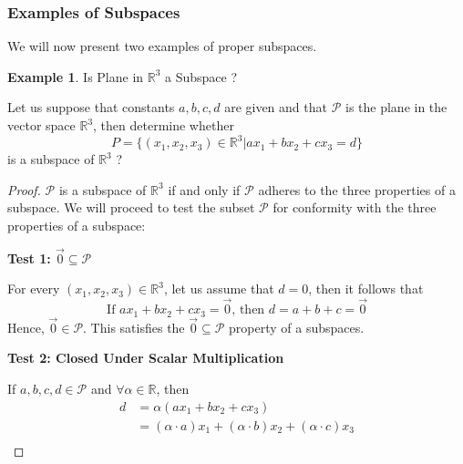 \documentclass{book}
\theoremstyle{definition}
\newtheorem{example}{Example}[definition]
\theoremstyle{remark}
\newcommand{\bb}[1]{\mathbb{#1}}
\newcommand{\cc}[1]{\mathcal{#1}}
\newcommand{\m}{\cdot}
\begin{document}
\newpage
\subsubsection{Examples of Subspaces}

We will now present two examples of proper subspaces. 

\begin{example}
Is Plane in $\bb{R}^3$ a Subspace ? 

    \begin{tcolorbox}
        Let us suppose that constants $a,b,c,d$ are given and that $\cc{P}$ is the plane in the vector space $\bb{R}^3$, then determine whether
        \begin{equation*}
            P = \{ (x_1,x_2,x_3) \in \bb{R}^3 | ax_1 + bx_2 + cx_3 = d \}
        \end{equation*}
        is a subspace of $\bb{R}^3$ ? \\
    \end{tcolorbox}
     
    \begin{proof}   
        $\cc{P}$ is a subspace of $\bb{R}^3$ if and only if $\cc{P}$ adheres to the three properties of a subspace. We will proceed to test the subset $\cc{P}$ for conformity with the three properties of a subspace: \\
        
        \begin{flushleft} \textbf{Test 1: $\vec{0} \subseteq \cc{P}$} \end{flushleft} 
            For every $(x_1,x_2,x_3) \in \bb{R}^3$, let us assume that $d=0$, then it follows that 
                \begin{equation*}
                    \text{If } ax_1 + bx_2 + cx_3 = \vec{0} \text{, then } d = a+b+c = \vec{0}
                \end{equation*}
            Hence, $ \vec{0} \in \cc{P}$. This satisfies the $\vec{0} \subseteq \cc{P}$ property of a subspaces. \\
        
        \begin{flushleft} \textbf{Test 2: Closed Under Scalar Multiplication} \end{flushleft}
            If $a,b,c,d \in \cc{P}$ and $\forall \alpha \in \bb{R}$, then 
                \begin{align*}
                    d & = \alpha(ax_1 + bx_2 + cx_3) \\
                        & = (\alpha \m a)x_1 + (\alpha \m b)x_2 + (\alpha \m c)x_3 \\
                \end{align*}
            

\end{proof}
\end{example}
\end{document}
